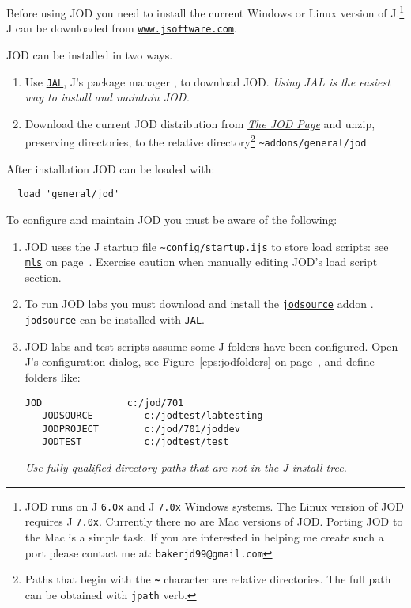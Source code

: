 Before using JOD you need to install the current Windows or Linux version of J.\footnote{JOD runs on 
 J \texttt{6.0x} and  J \texttt{7.0x} Windows systems. The Linux version of JOD requires J
\texttt{7.0x}. Currently there no are Mac versions of JOD. Porting JOD to the Mac is a simple task.
If you are interested in helping me create such a port please contact me at:  
\texttt{bakerjd99@gmail.com}
} J can be downloaded from \href{http://www.jsoftware.com}{\texttt{www.jsoftware.com}}.

JOD can be installed in two ways.  
\begin{enumerate}
	\item Use \href{http://202.67.223.49/jwiki/Addons/general/jod}{\texttt{JAL}}, J's package manager 
	\cite{jwiki:jal}, to download JOD. \emph{Using JAL is the easiest way to install and maintain JOD.}
	\item Download the current JOD distribution from \href{http://bakerjd99.wordpress.com/the-jod-page/}{\emph{The JOD Page}} \cite{baker:jodpages} and unzip, preserving directories, to the relative directory\footnote{Paths that begin with the \textbf{\texttt{\~}} character are relative directories. The full path can be obtained with \texttt{jpath} verb. } \verb|~addons/general/jod|
\end{enumerate}

After installation JOD can be loaded with:
\begin{verbatim}
  load 'general/jod'
\end{verbatim}

To configure and maintain JOD you must be aware of the following:
\begin{enumerate}
	\item JOD uses the J startup file \verb|~config/startup.ijs| to store load scripts: see 
	\hyperlink{il:mls}{\texttt{mls}} on page~\pageref{ss:mls}.  Exercise caution when manually
	editing JOD's load script section.
	\item To run JOD labs you must download and install the
	 \href{http://www.jsoftware.com/jwiki/Addons/general/jodsource}{\texttt{jodsource}} addon \cite{baker:jodsource}. 
	 \texttt{jodsource} can be installed with \texttt{JAL}.
	\item JOD labs and test scripts assume some J folders have been configured.  Open J's
	configuration dialog, see Figure~\ref{eps:jodfolders} on page~\pageref{eps:jodfolders}, and
	define folders like:
	\begin{lstlisting}[frame=single,framerule=0pt] 
   JOD               c:/jod/701
   JODSOURCE         c:/jodtest/labtesting
   JODPROJECT        c:/jod/701/joddev   
   JODTEST           c:/jodtest/test
  \end{lstlisting}
  \emph{Use fully qualified directory paths that are not in the J install tree.}
\end{enumerate} 



